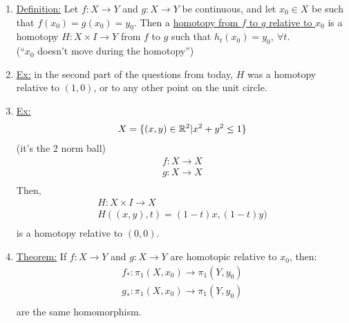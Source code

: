 \begin{enumerate}
\begin{enumerate}
\begin{align*}
                        f(x)=(x,0)\\
                        g(x)=(x,e^x)\\
                    \end{align*}
                    Just use the straight line homotopy it's not hard.
            \end{enumerate}
            Maybe include the drawings?
        \item \underline{Definition:} Let $f:X\rightarrow Y$ and $g: X\rightarrow Y$ be continuous,
            and let $x_0 \in X$ be such that $f(x_0)=g(x_0)=y_0$. Then a
            \underline{homotopy from $f$ to $g$ relative to $x_0$} is a homotopy $H:X\times I \rightarrow Y$
            from $f$ to $g$ such that $h_t(x_0)=y_0,\ \forall t$.\\
            (``$x_0$ doesn't move during the homotopy'')
        \item \underline{Ex:} in the second part of the questions from today, $H$ was a homotopy relative to $(1,0)$, or
            to any other point on the unit circle.
        \item \underline{Ex:}
            \begin{align*}
                X=\{(x,y)\in \mathbb{R}^2 | x^2+y^2\leq 1\}\\
            \end{align*}
            (it's the 2 norm ball)
            \begin{align*}
                f: X\rightarrow X\\
                g: X\rightarrow X\\
            \end{align*}
            Then,
            \begin{align*}
                H: X\times I \rightarrow X\\
                H((x,y),t)=(1-t)x, (1-t)y)\\
            \end{align*}
            is a homotopy relative to $(0,0)$.
        \item \underline{Theorem:} If $f:X\rightarrow Y$ and $g:X\rightarrow Y$ are
            homotopic relative to $x_0$, then:
                \begin{align*}
                    f_{*}:\pi_1(X,x_0)\rightarrow \pi_1(Y,y_0)\\
                    g_{*}:\pi_1(X,x_0)\rightarrow \pi_1(Y,y_0)\\
                \end{align*}
                are the same homomorphism.
    \end{enumerate}
